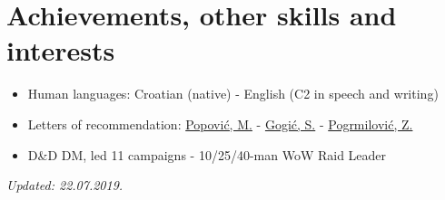 \documentclass[a4paper]{article}
\newcommand{\bolditalicpair}
[2]
{\textbf{#1} \texorpdfstring{\hfill}{} \textit{#2}}
\begin{document}
\section{Achievements, other skills and interests}

\begin{itemize}
  \item Human languages: Croatian (native) - English (C2 in speech and writing)
  \item Letters of recommendation: \href{https://github.com/MislavJaksic/CV/blob/master/LoR/AISoft_Popovic.pdf}{Popović, M.} - \href{https://github.com/MislavJaksic/CV/blob/master/LoR/Atos_Gogic.pdf}{Gogić, S.} - \href{https://github.com/MislavJaksic/CV/blob/master/LoR/Atos_Pogrmilovic.pdf}{Pogrmilović, Z.}
  \item D\&D DM, led 11 campaigns - 10/25/40-man WoW Raid Leader
\end{itemize}

\bolditalicpair{}{Updated: 22.07.2019.}
\end{document}
